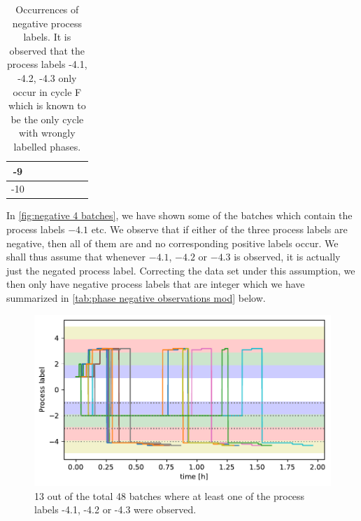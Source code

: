 \documentclass[../Thesis.tex]{subfiles}
\begin{document}
\begin{table}[ht]
\begin{tabular}{c|c|c|c|c|c|c}
        -9                     &                      &                      &                      & \cellcolor{black!50} & \cellcolor{black!50} & \cellcolor{black!50} \\\hline
        -10                    &                      & \cellcolor{black!50} &                      & \cellcolor{black!50} & \cellcolor{black!50} & \cellcolor{black!50}
    \end{tabular}
    \caption{Occurrences of negative process labels. It is observed that the process labels -4.1, -4.2, -4.3 only occur in cycle F which is known to be the only cycle with wrongly labelled phases.}
    \label{tab:phase negative observations}
\end{table}

In \autoref{fig:negative 4 batches}, we have shown some of the batches which contain the process labels $-4.1$ etc. We observe that if either of the three process labels are negative, then all of them are and no corresponding positive labels occur. We shall thus assume that whenever $-4.1$, $-4.2$ or $-4.3$ is observed, it is actually just the negated process label. Correcting the data set under this assumption, we then only have negative process labels that are integer which we have summarized in \autoref{tab:phase negative observations mod} below.
\begin{figure}[H]
    \centering
    \includegraphics[width=.83\linewidth]{figures/Multiple cycles data/Adding of solids/sample negative sub 4 phases.pdf}
    \caption{13 out of the total 48 batches where at least one of the process labels -4.1, -4.2 or -4.3 were observed.}
    \label{fig:negative 4 batches}
\end{figure}
\end{document}
